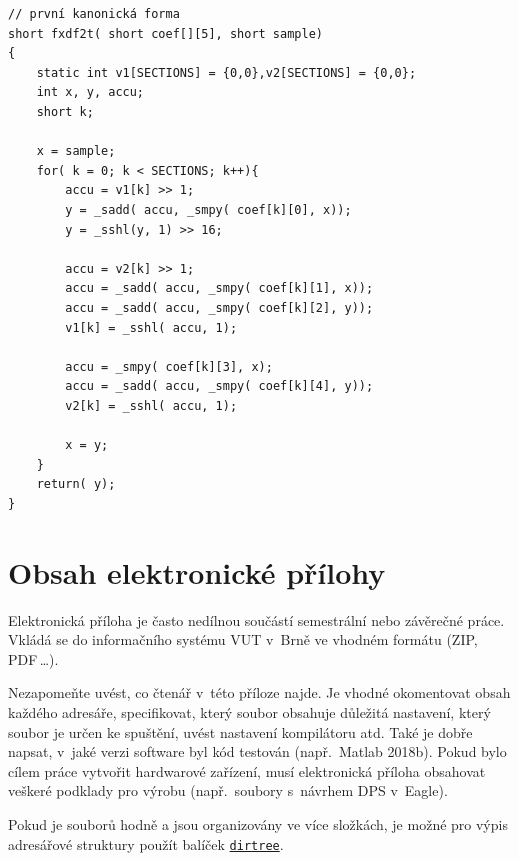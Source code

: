 \noindent
\begin{minipage}{\linewidth}



\begin{lstlisting}[frame=single,numbers=right,caption={Příklad implementace první kanonické formy v~jazyce C.},label=lst:priklad.vypis.kodu.C,basicstyle=\ttfamily\small, keywordstyle=\color{black}\bfseries\underbar,]
// první kanonická forma
short fxdf2t( short coef[][5], short sample)
{
	static int v1[SECTIONS] = {0,0},v2[SECTIONS] = {0,0};
	int x, y, accu;
	short k;

	x = sample;
	for( k = 0; k < SECTIONS; k++){
		accu = v1[k] >> 1;
		y = _sadd( accu, _smpy( coef[k][0], x));
		y = _sshl(y, 1) >> 16;

		accu = v2[k] >> 1;
		accu = _sadd( accu, _smpy( coef[k][1], x));
		accu = _sadd( accu, _smpy( coef[k][2], y));
		v1[k] = _sshl( accu, 1);

		accu = _smpy( coef[k][3], x);
		accu = _sadd( accu, _smpy( coef[k][4], y));
		v2[k] = _sshl( accu, 1);

		x = y;
	}
	return( y);
}
\end{lstlisting}
\end{minipage}







\chapter{Obsah elektronické přílohy}
Elektronická příloha je často nedílnou součástí semestrální nebo závěrečné práce.
Vkládá se do informačního systému VUT v~Brně ve vhodném formátu (ZIP, PDF\,\dots).

Nezapomeňte uvést, co čtenář v~této příloze najde.
Je vhodné okomentovat obsah každého adresáře, specifikovat, který soubor obsahuje důležitá nastavení, který soubor je určen ke spuštění, uvést nastavení kompilátoru atd.
Také je dobře napsat, v~jaké verzi software byl kód testován (např.\ Matlab 2018b).
Pokud bylo cílem práce vytvořit hardwarové zařízení,
musí elektronická příloha obsahovat veškeré podklady pro výrobu (např.\ soubory s~návrhem DPS v~Eagle).

Pokud je souborů hodně a jsou organizovány ve více složkách, je možné pro výpis adresářové struktury použít balíček \href{https://www.ctan.org/pkg/dirtree}{\texttt{dirtree}}.

